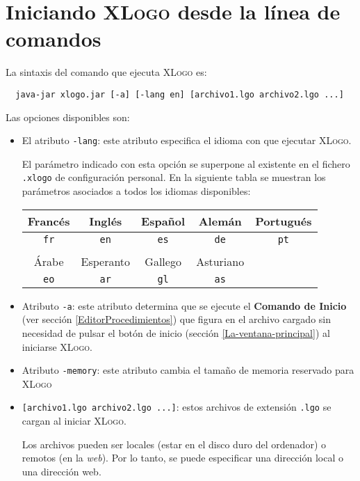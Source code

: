 \chapter{Iniciando \textsc{XLogo} desde la l\'inea de comandos}

\noindent La sintaxis del comando que ejecuta \textsc{XLogo} es:
\begin{verbatim}
  java-jar xlogo.jar [-a] [-lang en] [archivo1.lgo archivo2.lgo ...]
\end{verbatim}
Las opciones disponibles son:
\begin{itemize}
   \item El atributo \texttt{-lang}: este atributo especifica el idioma con que
      ejecutar \textsc{XLogo}.

      El par\'ametro indicado con esta opci\'on se superpone al existente en el
      fichero \texttt{.xlogo} de configuraci\'on personal. En la siguiente tabla
      se muestran los par\'ametros asociados a todos los idiomas disponibles:
      \begin{center} \begin{tabular}{|*{5}{c|}} \hline
         Franc\'es & Ingl\'es & Espa\~nol & Alem\'an & Portugu\'es \\ \hline
             \texttt{fr} & \texttt{en} & \texttt{es} & \texttt{de} & \texttt{pt} \\ \hline
              \multicolumn{5}{c}{ } \\ \hline
          \'Arabe & Esperanto & Gallego & Asturiano &  \\ \hline
             \texttt{eo} & \texttt{ar} & \texttt{gl} & \texttt{as} & \\ \hline
      \end{tabular} \end{center}
   \item Atributo \texttt{-a}: este atributo determina que se ejecute el 
      \textbf{Comando de Inicio} (ver secci\'on \ref{EditorProcedimientos}) que
      figura en el archivo cargado sin necesidad de pulsar el bot\'on de inicio
      (secci\'on \ref{La-ventana-principal}) al iniciarse \textsc{XLogo}.
    \item Atributo \texttt{-memory}: este atributo cambia el tama\~no de memoria
       reservado para \textsc{XLogo}
    \item \texttt{[archivo1.lgo archivo2.lgo ...]}: estos archivos de extensi\'on 
       \texttt{.lgo} se cargan al iniciar \textsc{XLogo}.

       Los archivos pueden ser locales (estar en el disco duro del ordenador) o
       remotos (en la \textit{web}). Por lo tanto, se puede especificar una
       direcci\'on local o una direcci\'on web.
\end{itemize}

